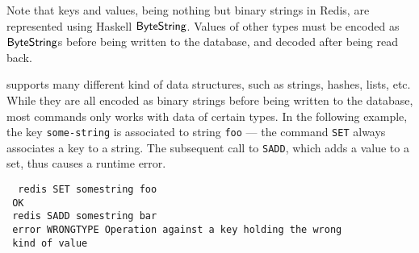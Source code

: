 Note that keys and values, being nothing but binary strings in Redis, are
represented using Haskell \ensuremath{\Conid{ByteString}}. Values of other types must be encoded
as \ensuremath{\Conid{ByteString}}s before being written to the database, and decoded after being
read back.


\Redis{} supports many different kind of data
structures, such as strings, hashes, lists, etc. While they are all encoded as
binary strings before being written to the database, most commands only works
with data of certain types. In the following example, the key
\texttt{some-string} is associated to string \texttt{foo} --- the command
\texttt{SET} always associates a key to a string. The subsequent call to \texttt{SADD}, which adds a value to a set, thus causes a runtime error.
\begin{tabbing}\tt
~redis~SET~somestring~foo\\
\tt ~OK\\
\tt ~redis~SADD~somestring~bar\\
\tt ~error~WRONGTYPE~Operation~against~a~key~holding~the~wrong\\
\tt ~kind~of~value
\end{tabbing}


